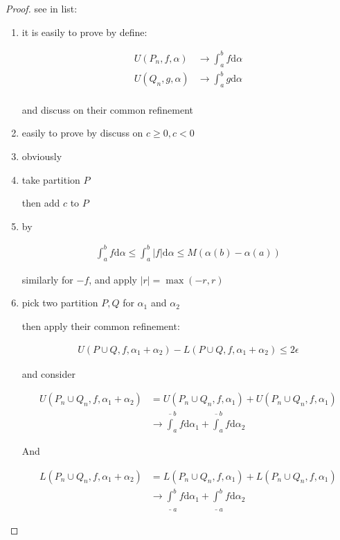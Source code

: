 \begin{proof}
    see in list:

    \begin{enumerate}
        \item it is easily to prove by define:
        
        \begin{align*}
        U(P_n, f, \alpha) & \to \int_a^b f \mathrm{d} \alpha \\
        U(Q_n, g, \alpha) & \to \int_a^b g \mathrm{d} \alpha \\
        \end{align*}
        
        and discuss on their common refinement

        \item easily to prove by discuss on $c \ge 0, c < 0$

        \item obviously
        
        \item take partition $P$ 
        
        then add $c$ to $P$

        \item by

        \begin{align*}
            \int_a^b f \mathrm{d} \alpha \le \int_a^b |f| \mathrm{d} \alpha \le M(\alpha(b) - \alpha(a))
        \end{align*}

        similarly for $-f$, and apply $|r| = \max(- r, r)$

        \item pick two partition $P, Q$ for $\alpha_1$ and $\alpha_2$
        
        then apply their common refinement:

        \begin{align*}
            U(P \cup Q,f, \alpha_1 + \alpha_2) - L(P \cup Q,f, \alpha_1 + \alpha_2) \le 2 \epsilon
        \end{align*}

        and consider

        \begin{align*}
            U(P_n \cup Q_n,f, \alpha_1 + \alpha_2) &=U(P_n \cup Q_n,f, \alpha_1) + U(P_n \cup Q_n,f, \alpha_1) \\
            & \to \overline{\int}_{a}^b f \mathrm{d} \alpha_1 + \overline{\int}_{a}^b f \mathrm{d} \alpha_2
        \end{align*}

        And

        \begin{align*}
            L(P_n \cup Q_n,f, \alpha_1 + \alpha_2) &= L(P_n \cup Q_n,f, \alpha_1) + L(P_n \cup Q_n,f, \alpha_1) \\
            & \to \underline{\int}_{a}^b f \mathrm{d} \alpha_1 + \underline{\int}_{a}^b f \mathrm{d} \alpha_2
        \end{align*}
    \end{enumerate}
\end{proof}

